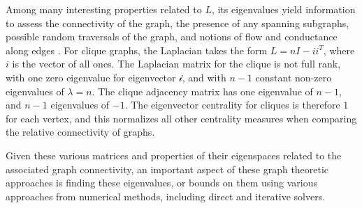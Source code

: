 \documentclass[12pt,letterpaper]{article}
\begin{document}
Among many interesting properties related to $L$, its eigenvalues yield information to assess the connectivity of the graph, the presence of any spanning subgraphs, possible random traversals of the graph, and notions of flow and conductance along edges \cite{Chung1996}. For clique graphs, the Laplacian takes the form $L = nI - ii^T$, where $i$ is the vector of all ones. The Laplacian matrix for the clique is not full rank, with one zero eigenvalue for eigenvector $\mathcal{i}$, and with $n-1$ constant non-zero eigenvalues of $\lambda = n$. The clique adjacency matrix has one eigenvalue of $n-1$, and $n-1$ eigenvalues of $-1$. The eigenvector centrality for cliques is therefore $1$ for each vertex, and this normalizes all other centrality measures when comparing the relative connectivity of graphs.

Given these various matrices and properties of their eigenspaces related to the associated graph connectivity, an important aspect of these graph theoretic approaches is finding these eigenvalues, or bounds on them using various approaches from numerical methods, including direct and iterative solvers.






\newpage
% 

\end{document}

